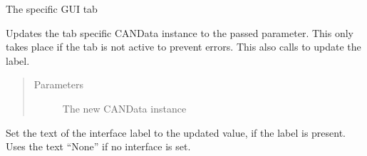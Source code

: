 \documentclass[letterpaper,10pt,english]{sphinxmanual}
\begin{document}
\begin{fulllineitems}

\begin{fulllineitems}
\label{\detokenize{src:src.AbstractTab.AbstractTab.tabWidget}}
The specific GUI tab

\end{fulllineitems}


\begin{fulllineitems}
\label{\detokenize{src:src.AbstractTab.AbstractTab.toggleGUIElements}}
\end{fulllineitems}


\begin{fulllineitems}
\label{\detokenize{src:src.AbstractTab.AbstractTab.updateCANDataInstance}}
Updates the tab specific CANData instance to the passed parameter.
This only takes place if the tab is not active to prevent errors.
This also calls {\hyperref[\detokenize{src:src.AbstractTab.AbstractTab.updateInterfaceLabel}]{}} to update the label.
\begin{quote}\begin{description}
\item[{Parameters}] \leavevmode
{} \textendash{} The new CANData instance

\end{description}\end{quote}

\end{fulllineitems}


\begin{fulllineitems}
\label{\detokenize{src:src.AbstractTab.AbstractTab.updateInterfaceLabel}}
Set the text of the interface label to the updated value, if the label is present.
Uses the text “None” if no interface is set.

\end{fulllineitems}


\end{fulllineitems}
\end{document}
